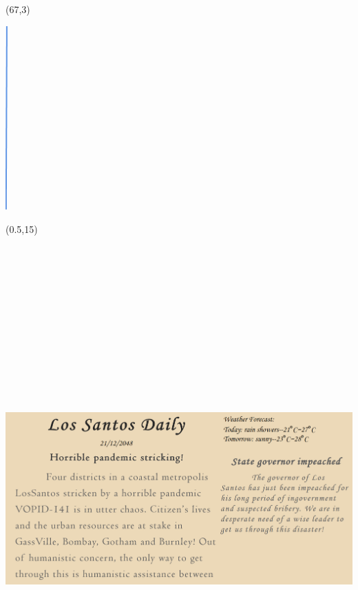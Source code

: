 \documentclass[hyperref={pdfpagelabels=false}]{beamer}
\begin{document}
\begin{frame}
\begin{turn}{60}
	\begin{textblock}{1}(67,3)
		\begin{blankbox}
			\centering
			\includegraphics[height=200pt]{img/aLine}
		\end{blankbox}
	\end{textblock}
\end{turn}


	\begin{textblock}{9}(0.5,15)
		\begin{blankbox}
			\centering
			\includegraphics[angle=8,height=550pt]{img/news.png}
		\end{blankbox}
	\end{textblock}


\end{frame}
\end{document}
